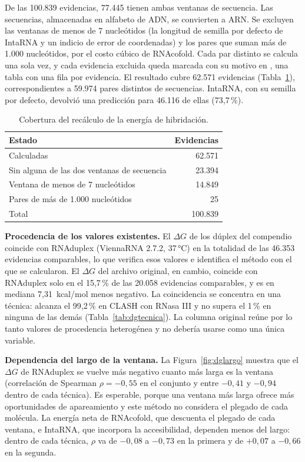 \documentclass[11pt,a4paper]{article}
\newcommand{\dG}{$\Delta G$}
\newcommand{\codigo}[1]{\texttt{\detokenize{#1}}}
\begin{document}
De las 100.839 evidencias, 77.445 tienen ambas ventanas de secuencia. Las secuencias, almacenadas en alfabeto de ADN, se convierten a ARN. Se excluyen las ventanas de menos de 7 nucleótidos (la longitud de semilla por defecto de IntaRNA y un indicio de error de coordenadas) y los pares que suman más de 1.000 nucleótidos, por el costo cúbico de RNAcofold. Cada par distinto se calcula una sola vez, y cada evidencia excluida queda marcada con su motivo en \codigo{db/analisis/dg_recalculado.csv}, una tabla con una fila por evidencia. El resultado cubre 62.571 evidencias (Tabla~\ref{tab:cobertura}), correspondientes a 59.974 pares distintos de secuencias. IntaRNA, con su semilla por defecto, devolvió una predicción para 46.116 de ellas (73,7\,\%).

\begin{table}[htbp]
\centering\small
\caption{Cobertura del recálculo de la energía de hibridación.}
\label{tab:cobertura}
\begin{tabular}{l r}
\toprule
Estado & Evidencias\\
\midrule
Calculadas & 62.571\\
Sin alguna de las dos ventanas de secuencia & 23.394\\
Ventana de menos de 7 nucleótidos & 14.849\\
Pares de más de 1.000 nucleótidos & 25\\
\midrule
Total & 100.839\\
\bottomrule
\end{tabular}
\end{table}

\textbf{Procedencia de los valores existentes.} El \dG{} de los dúplex del compendio coincide con RNAduplex (ViennaRNA 2.7.2, 37\,°C) en la totalidad de las 46.353 evidencias comparables, lo que verifica esos valores e identifica el método con el que se calcularon. El \dG{} del archivo original, en cambio, coincide con RNAduplex solo en el 15,7\,\% de las 20.058 evidencias comparables, y es en mediana 7,31~kcal/mol menos negativo. La coincidencia se concentra en una técnica: alcanza el 99,2\,\% en CLASH con RNasa III y no supera el 1\,\% en ninguna de las demás (Tabla~\ref{tab:dgtecnica}). La columna original reúne por lo tanto valores de procedencia heterogénea y no debería usarse como una única variable.

\textbf{Dependencia del largo de la ventana.} La Figura~\ref{fig:dglargo} muestra que el \dG{} de RNAduplex se vuelve más negativo cuanto más larga es la ventana (correlación de Spearman $\rho=-0{,}55$ en el conjunto y entre $-0{,}41$ y $-0{,}94$ dentro de cada técnica). Es esperable, porque una ventana más larga ofrece más oportunidades de apareamiento y este método no considera el plegado de cada molécula. La energía neta de RNAcofold, que descuenta el plegado de cada ventana, e IntaRNA, que incorpora la accesibilidad, dependen menos del largo: dentro de cada técnica, $\rho$ va de $-0{,}08$ a $-0{,}73$ en la primera y de $+0{,}07$ a $-0{,}66$ en la segunda.
\end{document}
